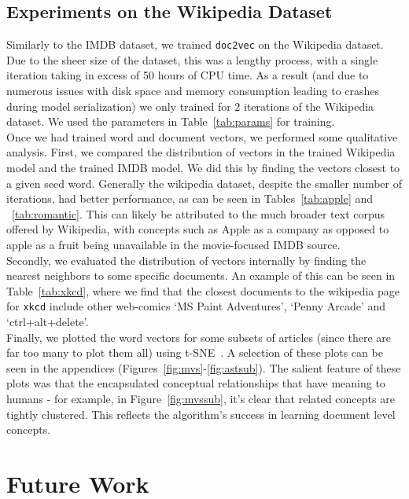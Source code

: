 \documentclass[11pt]{article}
\begin{document}
  \subsection*{Experiments on the Wikipedia Dataset}
    Similarly to the IMDB dataset, we trained \texttt{doc2vec} on the Wikipedia
    dataset. Due to the sheer size of the dataset, this was a lengthy process, with
    a single iteration taking in excess of 50 hours of CPU time. As a result (and due
    to numerous issues with disk space and memory consumption leading to crashes
    during model serialization) we only trained for 2 iterations of the Wikipedia
    dataset. We used the parameters in Table~\ref{tab:params} for training.\\
    Once we had trained word and document vectors, we performed some qualitative
    analysis. First, we compared the distribution of vectors in the trained Wikipedia
    model and the trained IMDB model. We did this by finding the vectors closest to
    a given seed word. Generally the wikipedia dataset, despite the smaller number of
    iterations, had better performance, as can be seen in Tables~\ref{tab:apple} and
    ~\ref{tab:romantic}. This can likely be attributed to the much broader text corpus
    offered by Wikipedia, with concepts such as Apple as a company as opposed to apple
    as a fruit being unavailable in the movie-focused IMDB source.\\
    Secondly, we evaluated the distribution of vectors internally by finding the nearest
    neighbors to some specific documents. An example of this can be seen in
    Table~\ref{tab:xkcd}, where we find that the closest documents to the wikipedia page
    for \texttt{xkcd} include other web-comics `MS Paint Adventures', `Penny Arcade' and
    `ctrl+alt+delete'.\\
    Finally, we plotted the word vectors for some subsets of articles (since there are
    far too many to plot them all) using t-SNE~\cite{maaten2008visualizing}.
    A selection of these plots can be seen in the appendices
    (Figures~\ref{fig:mvs}-\ref{fig:astsub}). The salient feature of these plots was that
    the encapsulated conceptual relationships that have meaning to humans - for example,
    in Figure~\ref{fig:mvssub}, it's clear that related concepts are tightly clustered.
    This reflects the algorithm's success in learning document level concepts.

\section*{Future Work}
\end{document}
